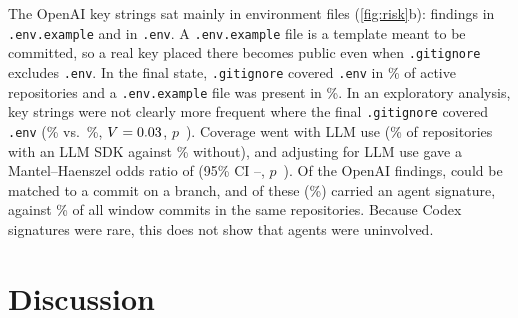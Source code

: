 \documentclass{article}
\begin{document}
The OpenAI key strings sat mainly in environment files (\cref{fig:risk}b): \NRqFourOpenaiFilesEnvExample{} findings in \texttt{.env.example} and \NRqFourOpenaiFilesEnv{} in \texttt{.env}. A \texttt{.env.example} file is a template meant to be committed, so a real key placed there becomes public even when \texttt{.gitignore} excludes \texttt{.env}. In the final state, \texttt{.gitignore} covered \texttt{.env} in \NRqFourGitignoreCoversEnvPct\% of active repositories and a \texttt{.env.example} file was present in \NRqFourEnvExamplePct\%. In an exploratory analysis, key strings were not clearly more frequent where the final \texttt{.gitignore} covered \texttt{.env} (\NRqFourGitignoreAssocWithIgnore\% vs.\ \NRqFourGitignoreAssocWithoutIgnore\%, $V = \num{0.03}$, $p$~\NRqFourGitignoreAssocP). Coverage went with LLM use (\NRqFourGitignoreAssocIgnoreAmongLlm\% of repositories with an LLM SDK against \NRqFourGitignoreAssocIgnoreAmongNoLlm\% without), and adjusting for LLM use gave a Mantel--Haenszel odds ratio of \NRqFourGitignoreAssocMhOr{} (95\% CI \NRqFourGitignoreAssocMhLo--\NRqFourGitignoreAssocMhHi, $p$~\NRqFourGitignoreAssocMhP). Of the \NRqFourKeyCommitsFindings{} OpenAI findings, \NRqFourKeyCommitsMatched{} could be matched to a commit on a branch, and \NRqFourKeyCommitsSignedN{} of these (\NRqFourKeyCommitsSignedPct\%) carried an agent signature, against \NRqFourKeyCommitsBaselineSignedSameReposPct\% of all window commits in the same repositories. Because Codex signatures were rare, this does not show that agents were uninvolved.

\section{Discussion}\label{sec:discussion}
\end{document}
